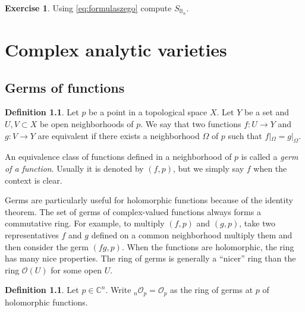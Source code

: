 \documentclass[12pt,openany]{book}
\newcommand{\C}{{\mathbb{C}}}
\newcommand{\bB}{{\mathbb{B}}}
\newcommand{\sO}{{\mathscr{O}}}
\newcommand{\myindex}[1]{#1\index{#1}}
\theoremstyle{plain}
\theoremstyle{remark}
\theoremstyle{definition}
\newtheorem{defn}[thm]{Definition}
\newenvironment{exbox}{%
    \def\FrameCommand{\vrule width 1pt \relax\hspace {10pt}}%
    \MakeFramed {\advance \hsize -\width \FrameRestore }%
}{%
    \endMakeFramed
}
\theoremstyle{exercise}
\newtheorem{exercise}{Exercise}[section]
\theoremstyle{example}
\begin{document}
\begin{exbox}
\begin{exercise}
Using \eqref{eq:formulaszego} compute $S_{\bB_n}$.
\end{exercise}
\end{exbox}

%
%
%
%


\chapter{Complex analytic varieties} \label{ch:analyticvarieties}


\section{Germs of functions}

\begin{defn}
Let $p$ be a point in a topological space $X$.  Let $Y$ be a set and
$U, V \subset X$ be open neighborhoods of $p$.  We say that
two functions $f \colon U \to Y$ and
$g \colon V \to Y$ are equivalent if there exists a neighborhood
$\Omega$ of $p$ such that $f|_\Omega = g|_\Omega$.

An equivalence class of functions defined in a neighborhood of $p$
is called a \emph{\myindex{germ of a function}}.
%
Usually it is denoted by $(f,p)$, but we simply say $f$ when
the context is clear.
\end{defn}

Germs are particularly useful for holomorphic functions because of the identity
theorem.  The set of germs of complex-valued functions always forms a
commutative ring.
For example, to multiply $(f,p)$ and $(g,p)$, take two representatives
$f$ and $g$ defined on a common neighborhood multiply them and
then consider the germ $(fg,p)$.
When the functions are holomorphic, the ring has many nice properties.
The ring of germs is generally a ``nicer'' ring than the ring $\sO(U)$ for
some open $U$.

\begin{defn}
Let $p \in \C^n$.
%
Write
${}_n\sO_p = \sO_p$ as the ring of germs at $p$ of holomorphic functions.
\end{defn}
\end{document}
